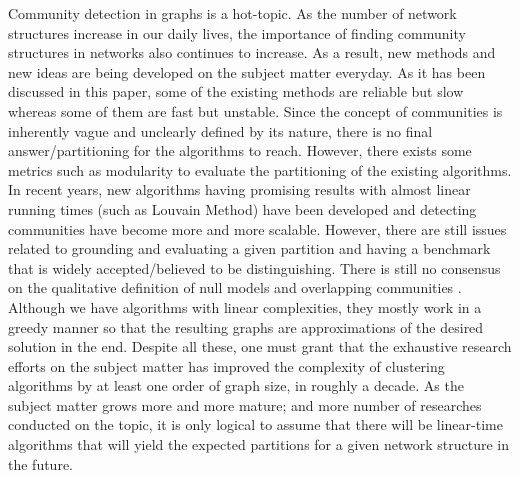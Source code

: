 \documentclass[10pt]{article}
\begin{document}
Community detection in graphs is a hot-topic. As the number of network structures increase in our daily lives, the importance of finding community structures in networks also continues to increase. As a result, new methods and new ideas are being developed on the subject matter everyday. As it has been discussed in this paper, some of the existing methods are reliable but slow whereas some of them are fast but unstable. Since the concept of communities is inherently vague and unclearly defined by its nature, there is no final answer/partitioning for the algorithms to reach. However, there exists some metrics such as modularity to evaluate the partitioning of the existing algorithms. \\

In recent years, new algorithms having promising results with almost linear running times (such as Louvain Method) have been developed and detecting communities have become more and more scalable. However, there are still issues related to grounding and evaluating a given partition and having a benchmark that is widely accepted/believed to be distinguishing. There is still no consensus on the qualitative definition of null models and overlapping communities \cite{fortunato}. Although we have algorithms with linear complexities, they mostly work in a greedy manner so that the resulting graphs are approximations of the desired solution in the end. Despite all these, one must grant that the exhaustive research efforts on the subject matter has improved the complexity of clustering algorithms by at least one order of graph size, in roughly a decade. As the subject matter grows more and more mature; and more number of researches conducted on the topic, it is only logical to assume that there will be linear-time algorithms that will yield the expected partitions for a given network structure in the future. \\
\end{document}
